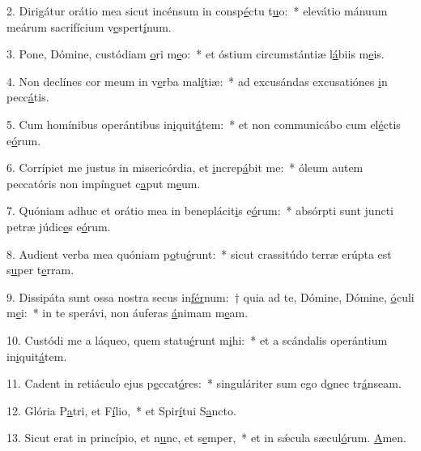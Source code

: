 2. Dirigátur orátio mea sicut incénsum in consp\uline{é}ctu t\uline{u}o:~* elevátio mánuum meárum sacrifícium v\uline{e}spert\uline{í}num.\par 
3. Pone, Dómine, custódiam \uline{o}ri m\uline{e}o:~* et óstium circumstántiæ l\uline{á}biis m\uline{e}is.\par 
4. Non declínes cor meum in v\uline{e}rba mal\uline{í}tiæ:~* ad excusándas excusatiónes \uline{i}n pecc\uline{á}tis.\par 
5. Cum homínibus operántibus in\uline{i}quit\uline{á}tem:~* et non communicábo cum el\uline{é}ctis e\uline{ó}rum.\par 
6. Corrípiet me justus in misericórdia, et \uline{i}ncrep\uline{á}bit me:~* óleum autem peccatóris non impínguet c\uline{a}put m\uline{e}um.\par 
7. Quóniam adhuc et orátio mea in beneplácit\uline{i}s e\uline{ó}rum:~* absórpti sunt juncti petræ júdic\uline{e}s e\uline{ó}rum.\par 
8. Audient verba mea quóniam p\uline{o}tu\uline{é}runt:~* sicut crassitúdo terræ erúpta est s\uline{u}per t\uline{e}rram.\par 
9. Dissipáta sunt ossa nostra secus in\uline{fér}num:~† quia ad te, Dómine, Dómine, \uline{ó}culi m\uline{e}i:~* in te sperávi, non áuferas \uline{á}nimam m\uline{e}am.\par 
10. Custódi me a láqueo, quem statu\uline{é}runt m\uline{i}hi:~* et a scándalis operántium in\uline{i}quit\uline{á}tem.\par 
11. Cadent in retiáculo ejus p\uline{e}ccat\uline{ó}res:~* singuláriter sum ego d\uline{o}nec tr\uline{á}nseam.\par 
12. Glória P\uline{a}tri, et F\uline{í}lio,~* et Spir\uline{í}tui S\uline{a}ncto.\par 
13. Sicut erat in princípio, et n\uline{u}nc, et s\uline{e}mper,~* et in sǽcula sæcul\uline{ó}rum. \uline{A}men.\par 
